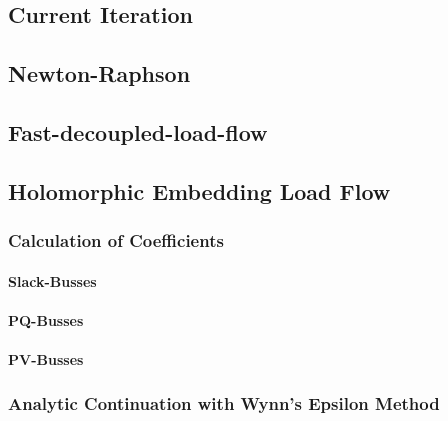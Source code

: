 \subsection{Current Iteration}

\subsection{Newton-Raphson}

\subsection{Fast-decoupled-load-flow}

\subsection{Holomorphic Embedding Load Flow}

\subsubsection{Calculation of Coefficients}

\paragraph{Slack-Busses}

\paragraph{PQ-Busses}

\paragraph{PV-Busses}

\subsubsection{Analytic Continuation with Wynn's Epsilon Method}
